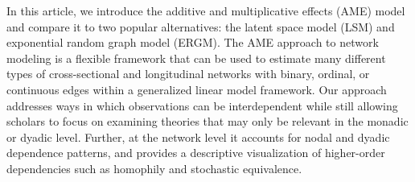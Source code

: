 \documentclass[12pt,pdflatex]{elsarticle}
\begin{document}

In this article, we introduce the additive and multiplicative effects (AME) model and compare it to two popular alternatives: the latent space model (LSM) and exponential random graph model (ERGM). The AME approach to network modeling is a flexible framework that can be used to estimate many different types of cross-sectional and longitudinal networks with binary, ordinal, or continuous edges within a generalized linear model framework. Our approach addresses ways in which observations can be interdependent while still allowing scholars to focus on examining theories that may only be relevant in the monadic or dyadic level. Further, at the network level it accounts for nodal and dyadic dependence patterns, and provides a descriptive visualization of higher-order dependencies such as homophily and stochastic equivalence. 



\end{document}
